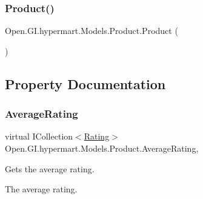 \hypertarget{class_open_1_1_g_i_1_1hypermart_1_1_models_1_1_product_a6e3b824c07f190baa506f9c73da63e62}{}\label{class_open_1_1_g_i_1_1hypermart_1_1_models_1_1_product_a6e3b824c07f190baa506f9c73da63e62} 
\subsubsection{\texorpdfstring{Product()}{Product()}\hspace{0.1cm}{\footnotesize\ttfamily [2/2]}}
{\footnotesize\ttfamily Open.\+G\+I.\+hypermart.\+Models.\+Product.\+Product (\begin{DoxyParamCaption}{ }\end{DoxyParamCaption})}



\subsection{Property Documentation}
\hypertarget{class_open_1_1_g_i_1_1hypermart_1_1_models_1_1_product_aa13c2560a38bf25cc01435cef5e2ba7e}{}\label{class_open_1_1_g_i_1_1hypermart_1_1_models_1_1_product_aa13c2560a38bf25cc01435cef5e2ba7e} 
\subsubsection{\texorpdfstring{Average\+Rating}{AverageRating}}
{\footnotesize\ttfamily virtual I\+Collection$<$\hyperlink{class_open_1_1_g_i_1_1hypermart_1_1_models_1_1_rating}{Rating}$>$ Open.\+G\+I.\+hypermart.\+Models.\+Product.\+Average\+Rating\hspace{0.3cm}{\ttfamily [get]}, {\ttfamily [set]}}



Gets the average rating. 

The average rating. \hypertarget{class_open_1_1_g_i_1_1hypermart_1_1_models_1_1_product_a8d7cb8cd22f77fa66f06726400b1381e}{}\label{class_open_1_1_g_i_1_1hypermart_1_1_models_1_1_product_a8d7cb8cd22f77fa66f06726400b1381e} 
